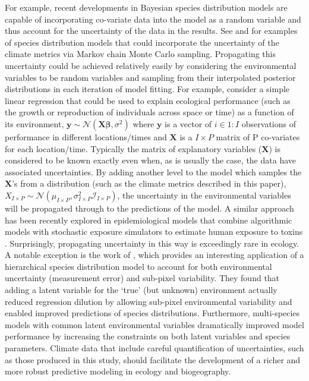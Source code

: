 \documentclass[12pt]{article}
\begin{document}
For example, recent developments in Bayesian species distribution
models are capable of incorporating co-variate data into the model as a random variable and thus account for the
uncertainty of the data in the results. See \citet{chakraborty_modeling_2010,chakraborty_point_2011} and \citet{mcinerny_fine-scale_2011} for
examples of species distribution models that could incorporate the
uncertainty of the climate metrics via Markov chain Monte Carlo
sampling.  
Propagating this uncertainty could be achieved relatively easily by
considering the environmental variables to be random variables and
sampling from their interpolated posterior distributions in each
iteration of model fitting.
For example, consider a simple linear regression that could be used
to explain ecological performance (such as the growth or reproduction
of individuals across space or time) as a function of its environment,
$\boldsymbol{y}\sim\mathcal{N}(\boldsymbol{X\beta},\sigma^2)$ where $\boldsymbol{y}$ is a vector
of $i\in1:I$ observations of performance in different locations/times and $\boldsymbol{X}$ is a $I\times P$
matrix of P co-variates for each location/time.  Typically the matrix of
explanatory variables ($\boldsymbol{X}$) is considered to be known
exactly even when, as is usually the case, the data have associated uncertainties.  
By adding another level to the model which samples the $\boldsymbol{X}$'s from a distribution (such as the
climate metrics described in this paper),
$X_{I\times P}\sim\mathcal{N}(\mu_{I\times P},\sigma_{I\times P}^2\mathcal{I}_{I\times P})$, the uncertainty in the environmental variables will
be propagated through to the predictions of the model.         A similar approach has been recently explored in epidemiological models
that combine algorithmic models with stochastic exposure simulators to estimate
human exposure to toxins \citep{gelfand_combining_2010}.    Surprisingly, propagating uncertainty in this way is exceedingly rare in ecology.     A notable exception is the work of \citet{mcinerny_fine-scale_2011}, which provides an interesting application of a hierarchical species distribution model to account for both environmental uncertainty (measurement error) and sub-pixel variability.  They found that adding a latent variable for the `true' (but unknown) environment actually reduced regression dilution by allowing sub-pixel environmental variability and enabled improved predictions of species distributions.  Furthermore,  multi-species models with common latent environmental variables  dramatically improved model performance by increasing the constraints on both latent variables and species parameters.  Climate data that include careful quantification of uncertainties, such as those produced in this study, should  facilitate the development of a richer and more robust predictive modeling in ecology and biogeography.  
\end{document}
